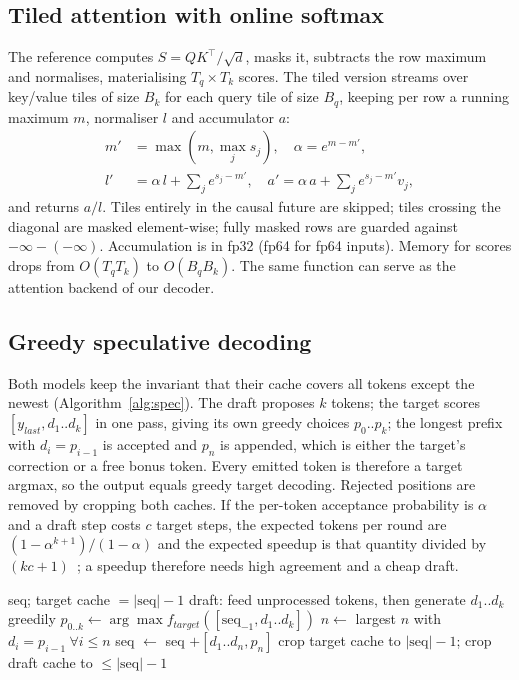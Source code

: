 \documentclass[conference]{IEEEtran}
\begin{document}
\subsection{Tiled attention with online softmax}
The reference computes $S = QK^\top/\sqrt{d}$, masks it, subtracts the row maximum and normalises, materialising $T_q\times T_k$ scores. The tiled version streams over key/value tiles of size $B_k$ for each query tile of size $B_q$, keeping per row a running maximum $m$, normaliser $l$ and accumulator $a$:
\begin{align}
m' &= \max(m, \max_j s_j), \quad \alpha = e^{m-m'},\\
l' &= \alpha\, l + \textstyle\sum_j e^{s_j - m'}, \quad a' = \alpha\, a + \textstyle\sum_j e^{s_j-m'}v_j,
\end{align}
and returns $a/l$. Tiles entirely in the causal future are skipped; tiles crossing the diagonal are masked element-wise; fully masked rows are guarded against $-\infty-(-\infty)$. Accumulation is in fp32 (fp64 for fp64 inputs). Memory for scores drops from $O(T_qT_k)$ to $O(B_qB_k)$. The same function can serve as the attention backend of our decoder.

\subsection{Greedy speculative decoding}
Both models keep the invariant that their cache covers all tokens except the newest (Algorithm~\ref{alg:spec}). The draft proposes $k$ tokens; the target scores $[y_{last}, d_1..d_k]$ in one pass, giving its own greedy choices $p_0..p_k$; the longest prefix with $d_i = p_{i-1}$ is accepted and $p_n$ is appended, which is either the target's correction or a free bonus token. Every emitted token is therefore a target argmax, so the output equals greedy target decoding. Rejected positions are removed by cropping both caches. If the per-token acceptance probability is $\alpha$ and a draft step costs $c$ target steps, the expected tokens per round are $(1-\alpha^{k+1})/(1-\alpha)$ and the expected speedup is that quantity divided by $(kc+1)$~\cite{leviathan2023fast}; a speedup therefore needs high agreement and a cheap draft.

\begin{algorithm}[t]\caption{One round of greedy speculative decoding}\label{alg:spec}
\begin{algorithmic}[1]
\Require seq; target cache $=|\text{seq}|-1$
\State draft: feed unprocessed tokens, then generate $d_1..d_k$ greedily
\State $p_{0..k}\gets\arg\max f_{target}([\text{seq}_{-1}, d_1..d_k])$ 
\State $n\gets$ largest $n$ with $d_i=p_{i-1}\ \forall i\le n$
\State seq $\gets$ seq $+ [d_1..d_n, p_n]$ 
\State crop target cache to $|\text{seq}|-1$; crop draft cache to $\le|\text{seq}|-1$
\end{algorithmic}\end{algorithm}
\end{document}

